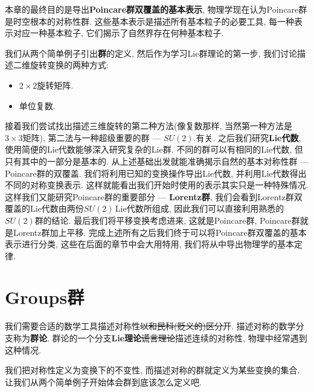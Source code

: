 本章的最终目的是导出{\bf{Poincare群双覆盖的基本表示}}, 物理学现在认为Poincare群是时空根本的对称性群. 这些基本表示是描述所有基本粒子的必要工具, 每一种表示对应一种基本粒子, 它们揭示了自然界存在何种基本粒子.

我们从两个简单例子引出{\bf{群}}的定义, 然后作为学习Lie群理论的第一步, 我们讨论描述二维旋转变换的两种方式:
\begin{itemize}
	\item $2 \times 2$旋转矩阵.
	\item 单位复数.
\end{itemize}

接着我们尝试找出描述三维旋转的第二种方法(像复数那样, 当然第一种方法是$3\times3$矩阵), 第二法与一种超级重要的群 --- {\bf{$SU(2)$}}.有关. 之后我们研究{\bf{Lie代数}}, 使用简便的Lie代数能够深入研究复杂的Lie群. 不同的群可以有相同的Lie代数, 但只有其中的一部分是基本的. 
从上述基础出发就能准确揭示自然的基本对称性群 --- Poincare群的双覆盖. 
我们将利用已知的变换操作导出Lie代数, 并利用Lie代数得出不同的对称变换表示. 这样就能看出我们开始时使用的表示其实只是一种特殊情况. 这样我们又能研究Poincare群的重要部分 --- {\bf{Lorentz群}}, 我们会看到Lorentz群双覆盖的Lie代数由两份$SU(2)$\,Lie代数所组成, 因此我们可以直接利用熟悉的$SU(2)$群的结论. 最后我们将平移变换考虑进来, 这就是Poincare群, Poincare群就是Lorentz群加上平移. 完成上述所有之后我们终于可以将Poincare群双覆盖的基本表示进行分类, 这些在后面的章节中会大用特用, 我们将从中导出物理学的基本定律.

\section[群]{Groups\quad 群}
\label{sec3.1}
我们需要合适的数学工具描述对称性\sout{以和民科(贬义的)区分开}. 描述对称的数学分支称为{\bf{群论}}. 群论的一个分支{\bf{Lie理论}}\sout{谎言理论}描述连续的对称性, 物理中经常遇到这种情况.

我们把对称性定义为变换下的不变性, 而描述对称的群就定义为某些变换的集合. 让我们从两个简单例子开始体会群到底该怎么定义吧.



